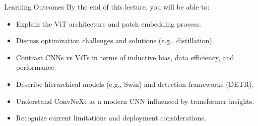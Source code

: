 \begin{frame}{Learning Outcomes}
By the end of this lecture, you will be able to:
\begin{itemize}
    \item Explain the ViT architecture and patch embedding process.
    \item Discuss optimization challenges and solutions (e.g., distillation).
    \item Contrast CNNs vs ViTs in terms of inductive bias, data efficiency, and performance.
    \item Describe hierarchical models (e.g., Swin) and detection frameworks (DETR).
    \item Understand ConvNeXt as a modern CNN influenced by transformer insights.
    \item Recognize current limitations and deployment considerations.
\end{itemize}
\end{frame}